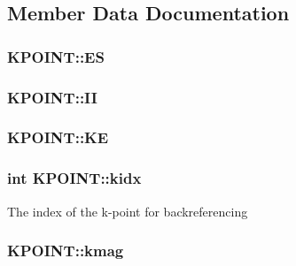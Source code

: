 \subsection{Member Data Documentation}
\hypertarget{struct_k_p_o_i_n_t_aee2d580a1094d40df128864b57990617}{
\subsubsection[{E\-S}]{ K\-P\-O\-I\-N\-T\-::\-E\-S}}\label{struct_k_p_o_i_n_t_aee2d580a1094d40df128864b57990617}
\hypertarget{struct_k_p_o_i_n_t_a2421bc448ee8e68b4937131bb40f202d}{
\subsubsection[{I\-I}]{ K\-P\-O\-I\-N\-T\-::\-I\-I}}\label{struct_k_p_o_i_n_t_a2421bc448ee8e68b4937131bb40f202d}
\hypertarget{struct_k_p_o_i_n_t_a374557e0bb5efa5576b259d900334cfc}{
\subsubsection[{K\-E}]{ K\-P\-O\-I\-N\-T\-::\-K\-E}}\label{struct_k_p_o_i_n_t_a374557e0bb5efa5576b259d900334cfc}
\hypertarget{struct_k_p_o_i_n_t_a96b3442328529ba292f03166eefa6d2e}{
\subsubsection[{kidx}]{\setlength{\rightskip}{0pt plus 5cm}int K\-P\-O\-I\-N\-T\-::kidx}}\label{struct_k_p_o_i_n_t_a96b3442328529ba292f03166eefa6d2e}
The index of the k-\/point for backreferencing \hypertarget{struct_k_p_o_i_n_t_a34c41cf43005cd912d4c8a64fd624e0a}{
\subsubsection[{kmag}]{ K\-P\-O\-I\-N\-T\-::kmag}}\label{struct_k_p_o_i_n_t_a34c41cf43005cd912d4c8a64fd624e0a}
